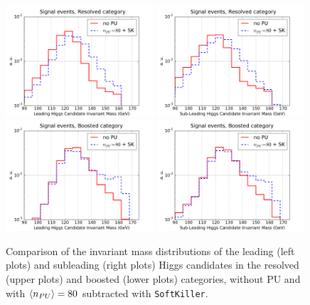 \begin{figure}[t]
  \begin{center}
      \vspace{-1cm}
      \includegraphics[width=0.49\textwidth]{plots/m_H0_res_comp.pdf}
      \includegraphics[width=0.49\textwidth]{plots/m_H1_res_comp.pdf}
      \includegraphics[width=0.49\textwidth]{plots/m_H0_bst_comp.pdf}
      \includegraphics[width=0.49\textwidth]{plots/m_H1_bst_comp.pdf}
  \caption{\small
    Comparison of the invariant mass distributions of the leading (left plots)
    and subleading (right plots) Higgs candidates in the resolved
    (upper plots) and boosted (lower plots) categories,
    without PU and with $\left\langle n_{PU}\right\rangle=80$ subtracted with {\tt SoftKiller}.
}
\label{fig:m_H_PU}
\end{center}
\end{figure}

